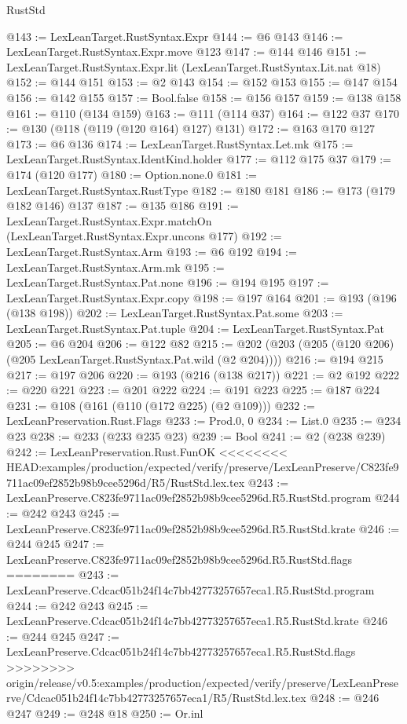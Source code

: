 \begin{lexlean}{RustStd}
\begin{coremodule}
{\begin{coremodule}
{{{{{{@143 := LexLeanTarget.RustSyntax.Expr
@144 := @6 @143
@146 := LexLeanTarget.RustSyntax.Expr.move @123
@147 := @144 @146
@151 := LexLeanTarget.RustSyntax.Expr.lit (LexLeanTarget.RustSyntax.Lit.nat @18)
@152 := @144 @151
@153 := @2 @143
@154 := @152 @153
@155 := @147 @154
@156 := @142 @155
@157 := Bool.false
@158 := @156 @157
@159 := @138 @158
@161 := @110 (@134 @159)
@163 := @111 (@114 @37)
@164 := @122 @37
@170 := @130 (@118 (@119 (@120 @164) @127) @131)
@172 := @163 @170 @127
@173 := @6 @136
@174 := LexLeanTarget.RustSyntax.Let.mk
@175 := LexLeanTarget.RustSyntax.IdentKind.holder
@177 := @112 @175 @37
@179 := @174 (@120 @177)
@180 := Option.none.{0}
@181 := LexLeanTarget.RustSyntax.RustType
@182 := @180 @181
@186 := @173 (@179 @182 @146) @137
@187 := @135 @186
@191 := LexLeanTarget.RustSyntax.Expr.matchOn (LexLeanTarget.RustSyntax.Expr.uncons @177)
@192 := LexLeanTarget.RustSyntax.Arm
@193 := @6 @192
@194 := LexLeanTarget.RustSyntax.Arm.mk
@195 := LexLeanTarget.RustSyntax.Pat.none
@196 := @194 @195
@197 := LexLeanTarget.RustSyntax.Expr.copy
@198 := @197 @164
@201 := @193 (@196 (@138 @198))
@202 := LexLeanTarget.RustSyntax.Pat.some
@203 := LexLeanTarget.RustSyntax.Pat.tuple
@204 := LexLeanTarget.RustSyntax.Pat
@205 := @6 @204
@206 := @122 @82
@215 := @202 (@203 (@205 (@120 @206) (@205 LexLeanTarget.RustSyntax.Pat.wild (@2 @204))))
@216 := @194 @215
@217 := @197 @206
@220 := @193 (@216 (@138 @217))
@221 := @2 @192
@222 := @220 @221
@223 := @201 @222
@224 := @191 @223
@225 := @187 @224
@231 := @108 (@161 (@110 (@172 @225) (@2 @109)))
@232 := LexLeanPreservation.Rust.Flags
@233 := Prod.{0, 0}
@234 := List.{0}
@235 := @234 @23
@238 := @233 (@233 @235 @23)
@239 := Bool
@241 := @2 (@238 @239)
@242 := LexLeanPreservation.Rust.FunOK
<<<<<<<< HEAD:examples/production/expected/verify/preserve/LexLeanPreserve/C823fe9711ac09ef2852b98b9cee5296d/R5/RustStd.lex.tex
@243 := LexLeanPreserve.C823fe9711ac09ef2852b98b9cee5296d.R5.RustStd.program
@244 := @242 @243
@245 := LexLeanPreserve.C823fe9711ac09ef2852b98b9cee5296d.R5.RustStd.krate
@246 := @244 @245
@247 := LexLeanPreserve.C823fe9711ac09ef2852b98b9cee5296d.R5.RustStd.flags
========
@243 := LexLeanPreserve.Cdcac051b24f14c7bb42773257657eca1.R5.RustStd.program
@244 := @242 @243
@245 := LexLeanPreserve.Cdcac051b24f14c7bb42773257657eca1.R5.RustStd.krate
@246 := @244 @245
@247 := LexLeanPreserve.Cdcac051b24f14c7bb42773257657eca1.R5.RustStd.flags
>>>>>>>> origin/release/v0.5:examples/production/expected/verify/preserve/LexLeanPreserve/Cdcac051b24f14c7bb42773257657eca1/R5/RustStd.lex.tex
@248 := @246 @247
@249 := @248 @18
@250 := Or.inl
}}}}}}
\end{coremodule}}
\end{coremodule}
\end{lexlean}
